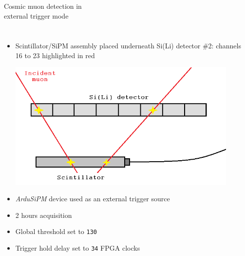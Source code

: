 \documentclass[aspectratio=169,xcolor=dvipsnames]{beamer}
\begin{document}
\begin{frame}{Cosmic muon detection in\\ \vskip-0.15cm external trigger mode}
    \addtolength{\leftmargini}{\labelsep}
    \fontsize{9pt}{1}\selectfont

    \begin{columns}
        \begin{itemize}
            \item Scintillator/SiPM assembly placed underneath Si(Li) detector \#2: channels 16 to 23 highlighted in red

            \vskip0.4cm
            \includegraphics[width=0.9\textwidth]{images/muon_detection/scintillator_sensor_detail.png}

            \vskip0.4cm
            \item \textit{ArduSiPM} device used as an external trigger source
            \item 2 hours acquisition
            \item Global threshold set to \texttt{130}
            \item Trigger hold delay set to \texttt{34} FPGA clocks
            
        \end{itemize}


\end{columns}
\end{frame}
\end{document}
